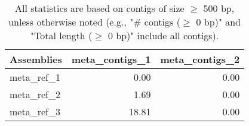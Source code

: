 \documentclass[12pt,a4paper]{article}
\begin{document}
\begin{table}[ht]
\begin{center}
\caption{All statistics are based on contigs of size $\geq$ 500 bp, unless otherwise noted (e.g., "\# contigs ($\geq$ 0 bp)" and "Total length ($\geq$ 0 bp)" include all contigs).}
\begin{tabular}{|l*{2}{|r}|}
\hline
Assemblies & meta\_contigs\_1 & meta\_contigs\_2 \\ \hline
meta\_ref\_1 & 0.00 & 0.00 \\ \hline
meta\_ref\_2 & 1.69 & 0.00 \\ \hline
meta\_ref\_3 & 18.81 & 0.00 \\ \hline
\end{tabular}
\end{center}
\end{table}
\end{document}
